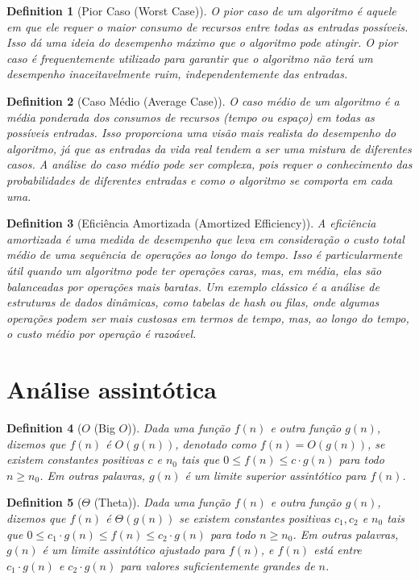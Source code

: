 \documentclass{article}
\newtheorem{definition}{Definition}[section]
\begin{document}
\begin{definition}[Pior Caso (Worst Case)]
O pior caso de um algoritmo é aquele em que ele requer o maior consumo de recursos entre todas as entradas possíveis. Isso dá uma ideia do desempenho máximo que o algoritmo pode atingir. O pior caso é frequentemente utilizado para garantir que o algoritmo não terá um desempenho inaceitavelmente ruim, independentemente das entradas.
\end{definition}

\begin{definition}[Caso Médio (Average Case)]
O caso médio de um algoritmo é a média ponderada dos consumos de recursos (tempo ou espaço) em todas as possíveis entradas. Isso proporciona uma visão mais realista do desempenho do algoritmo, já que as entradas da vida real tendem a ser uma mistura de diferentes casos. A análise do caso médio pode ser complexa, pois requer o conhecimento das probabilidades de diferentes entradas e como o algoritmo se comporta em cada uma.
\end{definition}

\begin{definition}[Eficiência Amortizada (Amortized Efficiency)]
A eficiência amortizada é uma medida de desempenho que leva em consideração o custo total médio de uma sequência de operações ao longo do tempo. Isso é particularmente útil quando um algoritmo pode ter operações caras, mas, em média, elas são balanceadas por operações mais baratas. Um exemplo clássico é a análise de estruturas de dados dinâmicas, como tabelas de hash ou filas, onde algumas operações podem ser mais custosas em termos de tempo, mas, ao longo do tempo, o custo médio por operação é razoável.
\end{definition}

\section{Análise assintótica}

\begin{definition}[$O$ (Big $O$)]
    Dada uma função \( f(n) \) e outra função \( g(n) \), dizemos que \( f(n) \) é \( O(g(n)) \), denotado como \( f(n) = O(g(n)) \), se existem constantes positivas \( c \) e \( n_0 \) tais que \( 0 \leq f(n) \leq c \cdot g(n) \) para todo \( n \geq n_0 \). Em outras palavras, \( g(n) \) é um limite superior assintótico para \( f(n) \).
\end{definition}

\begin{definition}[$\Theta$ (Theta)]
    Dada uma função \( f(n) \) e outra função \( g(n) \), dizemos que \( f(n) \) é \( \Theta(g(n)) \) se existem constantes positivas \( c_1, c_2 \) e \( n_0 \) tais que \( 0 \leq c_1 \cdot g(n) \leq f(n) \leq c_2 \cdot g(n) \) para todo \( n \geq n_0 \). Em outras palavras, \( g(n) \) é um limite assintótico ajustado para \( f(n) \), e \( f(n) \) está entre \( c_1 \cdot g(n) \) e \( c_2 \cdot g(n) \) para valores suficientemente grandes de \( n \).
\end{definition}
\end{document}
